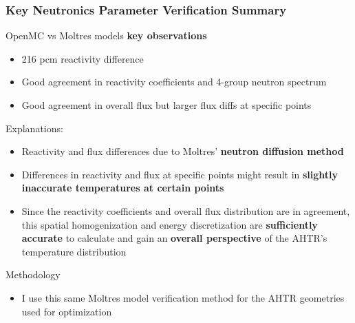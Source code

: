 \begin{frame}
    \frametitle{Key Neutronics Parameter Verification Summary}
    OpenMC vs Moltres models \textbf{key observations} 
    \begin{itemize}
        \item 216 pcm reactivity difference  
        \item Good agreement in reactivity coefficients and 4-group neutron spectrum
        \item Good agreement in overall flux but larger flux diffs at specific points
    \end{itemize}
    Explanations: 
    \begin{itemize}
        \item Reactivity and flux differences due to Moltres' \textbf{neutron diffusion 
        method} 
        \item Differences in reactivity and flux at specific points might result in 
        \textbf{slightly inaccurate temperatures at certain points}
        \item Since the reactivity coefficients and overall flux distribution 
        are in agreement, this spatial homogenization and energy discretization are 
        \textbf{sufficiently accurate} to calculate and gain an \textbf{overall perspective} 
        of the AHTR's temperature distribution
    \end{itemize}
    Methodology 
    \begin{itemize}
        \item I use this same Moltres model verification method for the AHTR geometries 
        used for optimization 
    \end{itemize}
\end{frame}

